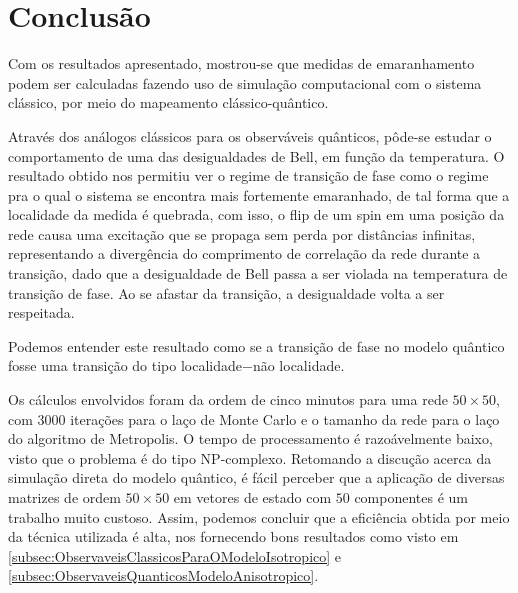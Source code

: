 \newpage

\section{Conclusão}
\label{sec:Conclusao}

Com os resultados apresentado, mostrou-se que medidas de emaranhamento podem ser calculadas fazendo uso de simulação computacional com o sistema clássico, por meio do mapeamento clássico-quântico. 

Através dos análogos clássicos para os observáveis quânticos, pôde-se estudar o comportamento de uma das desigualdades de Bell, em função da temperatura. O resultado obtido nos permitiu ver o regime de transição de fase como o regime pra o qual o sistema se encontra mais fortemente emaranhado, de tal forma que a localidade da medida é quebrada, com isso, o flip de um spin em uma posição da rede causa uma excitação que se propaga sem perda por distâncias infinitas, representando a divergência do comprimento de correlação da rede durante a transição, dado que a desigualdade de Bell passa a ser violada na temperatura de transição de fase.
Ao se afastar da transição, a desigualdade volta a ser respeitada.

Podemos entender este resultado como se a transição de fase no modelo quântico fosse uma transição do tipo localidade$-$não localidade. 

Os cálculos envolvidos foram da ordem de cinco minutos para uma rede $50 \times 50$, com 3000 iterações para o laço de Monte Carlo e o tamanho da rede para o laço do algoritmo de Metropolis. O tempo de processamento é razoávelmente baixo, visto que o problema é do tipo NP-complexo. Retomando a discução acerca da simulação direta do modelo quântico, é fácil perceber que a aplicação de diversas matrizes de ordem $50 \times 50$ em vetores de estado com $50$ componentes é um trabalho muito custoso. Assim, podemos concluir que a eficiência obtida por meio da técnica utilizada é alta, nos fornecendo bons resultados como visto em \ref{subsec:ObservaveisClassicosParaOModeloIsotropico} e \ref{subsec:ObservaveisQuanticosModeloAnisotropico}. 





\label{Referencias}


